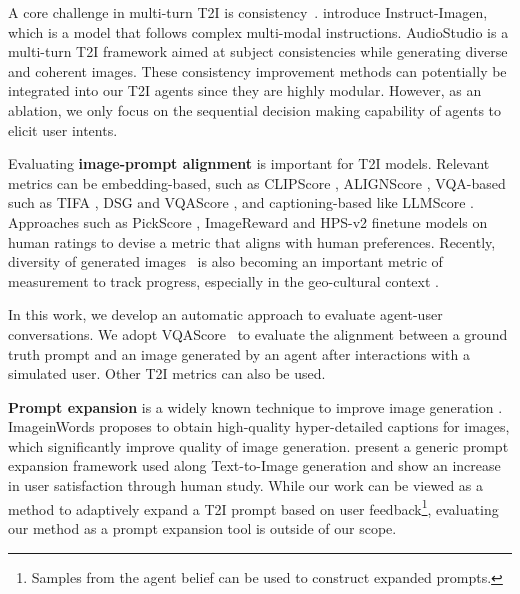  A core challenge in multi-turn T2I is consistency~\citep{cheng2024autostudio, cheng2024theatergen, zeqiang2023mini}. \cite{hu2024instruct} introduce Instruct-Imagen, which is a model that follows complex multi-modal instructions. AudioStudio \citep{cheng2024autostudio} is a multi-turn T2I framework aimed at subject consistencies while generating diverse and coherent images. These consistency improvement methods can potentially be integrated into our T2I agents since they are highly modular. However, as an ablation, we only focus on the sequential decision making capability of agents to elicit user intents. 


\label{metrics_discuss}

Evaluating \textbf{image-prompt alignment} is important for T2I models. Relevant metrics can be embedding-based, such as CLIPScore \citep{hessel2022clipscore}, ALIGNScore \citep{zha2023alignscore}, VQA-based such as TIFA \citep{hu2023tifa}, DSG \citep{cho2023davidsonian} and VQAScore \citep{lin2024evaluatingtexttovisualgenerationimagetotext}, and captioning-based like LLMScore \citep{lu2023llmscore}. Approaches such as PickScore \citep{kirstain2023pickapic}, ImageReward \citep{xu2023imagereward} and HPS-v2 \citep{wu2023human} finetune models on human ratings to devise a metric that aligns with human preferences. Recently, diversity of generated images~\citep{naeem2020reliablefidelitydiversitymetrics} is also becoming an important metric of measurement to track progress, especially in the geo-cultural context \citep{kannen2024aestheticsculturalcompetencetexttoimage, hall2024diginevaluatingdisparities}. %

In this work, we develop an automatic approach to evaluate agent-user conversations. We adopt VQAScore~\citep{lin2024evaluatingtexttovisualgenerationimagetotext} to evaluate the alignment between a ground truth prompt and an image generated by an agent after interactions with a simulated user. Other T2I metrics can also be used.



 \textbf{Prompt expansion} is a widely known technique to improve image generation \citep{betker2023improving}. ImageinWords \citep{garg2024imageinwordsunlockinghyperdetailedimage} proposes to obtain high-quality hyper-detailed captions for images, which significantly improve quality of image generation.  \cite{datta-etal-2024-prompt} present a generic prompt expansion framework used along Text-to-Image generation and show an increase in user satisfaction through human study. While our work can be viewed as a method to adaptively expand a T2I prompt based on user feedback\footnote{Samples from the agent belief can be used to construct expanded prompts.}, evaluating our method as a prompt expansion tool is outside of our scope.
 






